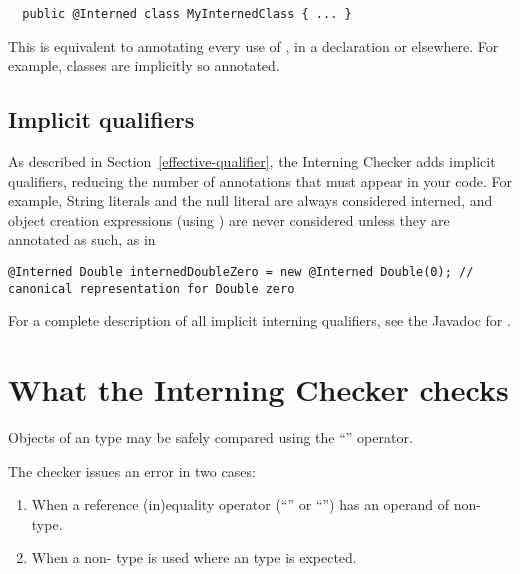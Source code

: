 \begin{Verbatim}
  public @Interned class MyInternedClass { ... }
\end{Verbatim}

This is equivalent to annotating every use of , in a
declaration or elsewhere.  For example,  classes are implicitly
so annotated.


\subsection{Implicit qualifiers\label{interning-implicit-qualifiers}}

As described in Section~\ref{effective-qualifier}, the Interning Checker
adds implicit qualifiers, reducing the number of annotations that must
appear in your code.
For example, String literals and the null literal are always considered interned, and
object creation expressions (using ) are never considered
 unless they are annotated as such, as in

\begin{smaller}
\begin{Verbatim}
@Interned Double internedDoubleZero = new @Interned Double(0); // canonical representation for Double zero
\end{Verbatim}
\end{smaller}

For a complete description of all implicit interning qualifiers, see the
Javadoc for .


\section{What the Interning Checker checks\label{interning-checks}}

Objects of an  type may be safely compared using the ``\code{==}''
operator.

The checker issues an error in two cases:

\begin{enumerate}

\item
  When a reference (in)equality operator (``\code{==}'' or ``\code{!=}'')
  has an operand of non- type.

\item
  When a non- type is used where an  type
  is expected.

\end{enumerate}

